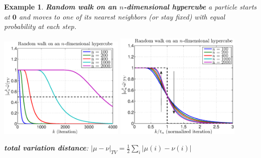 \documentclass[dvips,landscape]{foils}
\renewcommand{\oursection}[1]{
\foilhead[-1.0cm]{#1}
}
\newtheorem{definition}{Definition}
\newtheorem{example}{Example}
\DeclareMathOperator{\erf}{erf}
\begin{document}
\begin{example} \textbf{Random walk on an $n$-dimensional hypercube}
a particle starts at $\mathbf{0}$ and moves to one of its nearest neighbors (or stay fixed) with equal probability at each step.

\centerline{
\includegraphics[width=0.45\textwidth,trim=1cm -1cm 0cm 0cm]{rdwalk}
\includegraphics[width=0.45\textwidth,trim=1cm -1cm 0cm 0cm]{rdwalkn}
}


  \textbf{total variation distance}: $|\mu - \nu|_{TV} = \frac{1}{2}\sum_{i} |\mu(i)-\nu(i) |$

\end{example}

\end{document}
